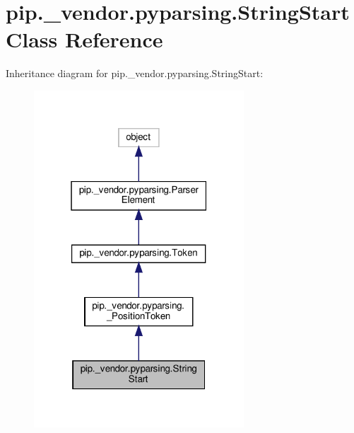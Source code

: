 \hypertarget{classpip_1_1__vendor_1_1pyparsing_1_1StringStart}{}\section{pip.\+\_\+vendor.\+pyparsing.\+String\+Start Class Reference}
\label{classpip_1_1__vendor_1_1pyparsing_1_1StringStart}


Inheritance diagram for pip.\+\_\+vendor.\+pyparsing.\+String\+Start\+:
\nopagebreak
\begin{figure}[H]
\begin{center}
\leavevmode
\includegraphics[width=223pt]{classpip_1_1__vendor_1_1pyparsing_1_1StringStart__inherit__graph}
\end{center}
\end{figure}


